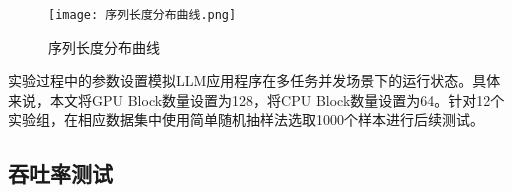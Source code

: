 \begin{figure}[!ht]
  \centering
  \texttt{[image: 序列长度分布曲线.png]}
  \caption{序列长度分布曲线}
  \label{Fig:序列长度分布曲线}
\end{figure}

实验过程中的参数设置模拟LLM应用程序在多任务并发场景下的运行状态。具体来说，本文将GPU Block数量设置为128，将CPU Block数量设置为64。针对12个实验组，在相应数据集中使用简单随机抽样法选取1000个样本进行后续测试。







\subsection{吞吐率测试}

